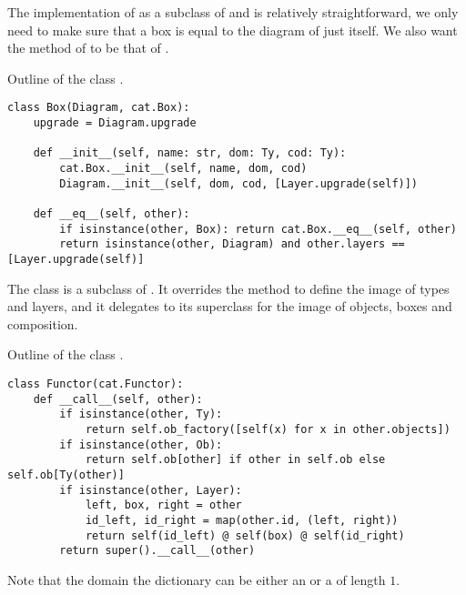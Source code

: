 The implementation of  as a subclass of  and  is relatively straightforward, we only need to make sure that a box is equal to the diagram of just itself.
We also want the  method of  to be that of .

\begin{python}
{\normalfont Outline of the class .}
\begin{verbatim}
class Box(Diagram, cat.Box):
    upgrade = Diagram.upgrade

    def __init__(self, name: str, dom: Ty, cod: Ty):
        cat.Box.__init__(self, name, dom, cod)
        Diagram.__init__(self, dom, cod, [Layer.upgrade(self)])

    def __eq__(self, other):
        if isinstance(other, Box): return cat.Box.__eq__(self, other)
        return isinstance(other, Diagram) and other.layers == [Layer.upgrade(self)]
\end{verbatim}
\end{python}

The  class is a subclass of .
It overrides the  method to define the image of types and layers, and it delegates to its superclass for the image of objects, boxes and composition.

\begin{python}
{\normalfont Outline of the class .}
\begin{verbatim}
class Functor(cat.Functor):
    def __call__(self, other):
        if isinstance(other, Ty):
            return self.ob_factory([self(x) for x in other.objects])
        if isinstance(other, Ob):
            return self.ob[other] if other in self.ob else self.ob[Ty(other)]
        if isinstance(other, Layer):
            left, box, right = other
            id_left, id_right = map(other.id, (left, right))
            return self(id_left) @ self(box) @ self(id_right)
        return super().__call__(other)
\end{verbatim}

Note that the domain the dictionary  can be either an  or a  of length $1$.
\end{python}

